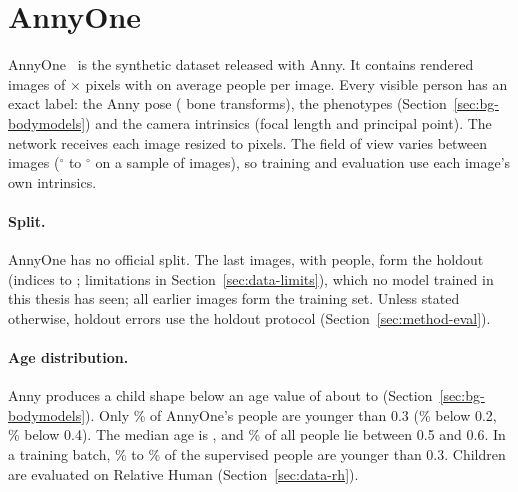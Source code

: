 \section{AnnyOne}
\label{sec:data-annyone}

AnnyOne~\cite{bregier2025anny} is the synthetic dataset released with Anny. It contains \DataAnnyOneImages{}
rendered images of \DataAnnyOneRenderPx{}$\times$\DataAnnyOneRenderPx{} pixels with on average
\DataAnnyOnePeoplePerImage{} people per image. Every visible person has an exact label: the Anny pose (\DataBones{} bone transforms), the \DataPhenotypes{} phenotypes
(Section~\ref{sec:bg-bodymodels}) and the camera intrinsics (focal length and principal point). The network receives
each image resized to \DataInputPx{} pixels. The field of view varies between images
(\DataAnnyOneFovMin{}$^\circ$ to \DataAnnyOneFovMax{}$^\circ$ on a sample of \DataAnnyOneFovSample{} images), so
training and evaluation use each image's own intrinsics.

\paragraph{Split.} AnnyOne has no official split. The last \MethodHoldoutN{} images, with \MethodHoldoutPeople{}
people, form the holdout (indices \DataHoldoutFirstIndex{} to \DataHoldoutLastIndex; limitations in Section~\ref{sec:data-limits}),
which no model trained in this thesis has seen; all earlier images form the training set. Unless stated otherwise,
holdout errors use the holdout protocol (Section~\ref{sec:method-eval}).

\paragraph{Age distribution.} Anny produces a child shape below an age value of about \DataChildAgeLow{} to
\DataChildAgeHigh{} (Section~\ref{sec:bg-bodymodels}). Only \DataAnnyOneAgeBelowThree\% of AnnyOne's people are
younger than 0.3 (\DataAnnyOneAgeBelowTwo\% below 0.2, \DataAnnyOneAgeBelowFour\% below 0.4). The median age is
\DataAnnyOneAgeMedian, and \DataAnnyOneAgeModeShare\% of all people lie between 0.5 and 0.6. In a training batch,
\DataBatchChildLow\% to \DataBatchChildHigh\% of the supervised people are younger than 0.3. Children are evaluated on
Relative Human (Section~\ref{sec:data-rh}).

